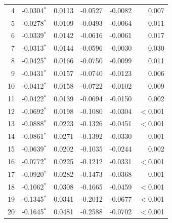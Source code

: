 \begin{longtable}{rrrrrr}
4 & -0.0304$^{*}$ & 0.0113 & -0.0527 & -0.0082 & 0.007 \\
5 & -0.0278$^{*}$ & 0.0109 & -0.0493 & -0.0064 & 0.011 \\
6 & -0.0339$^{*}$ & 0.0142 & -0.0616 & -0.0061 & 0.017 \\
7 & -0.0313$^{*}$ & 0.0144 & -0.0596 & -0.0030 & 0.030 \\
8 & -0.0425$^{*}$ & 0.0166 & -0.0750 & -0.0099 & 0.011 \\
9 & -0.0431$^{*}$ & 0.0157 & -0.0740 & -0.0123 & 0.006 \\
10 & -0.0412$^{*}$ & 0.0158 & -0.0722 & -0.0102 & 0.009 \\
11 & -0.0422$^{*}$ & 0.0139 & -0.0694 & -0.0150 & 0.002 \\
12 & -0.0692$^{*}$ & 0.0198 & -0.1080 & -0.0304 & $<$0.001 \\
13 & -0.0888$^{*}$ & 0.0223 & -0.1326 & -0.0451 & $<$0.001 \\
14 & -0.0861$^{*}$ & 0.0271 & -0.1392 & -0.0330 & 0.001 \\
15 & -0.0639$^{*}$ & 0.0202 & -0.1035 & -0.0244 & 0.002 \\
16 & -0.0772$^{*}$ & 0.0225 & -0.1212 & -0.0331 & $<$0.001 \\
17 & -0.0920$^{*}$ & 0.0282 & -0.1473 & -0.0368 & 0.001 \\
18 & -0.1062$^{*}$ & 0.0308 & -0.1665 & -0.0459 & $<$0.001 \\
19 & -0.1345$^{*}$ & 0.0341 & -0.2012 & -0.0677 & $<$0.001 \\
20 & -0.1645$^{*}$ & 0.0481 & -0.2588 & -0.0702 & $<$0.001 \\
\end{longtable}

